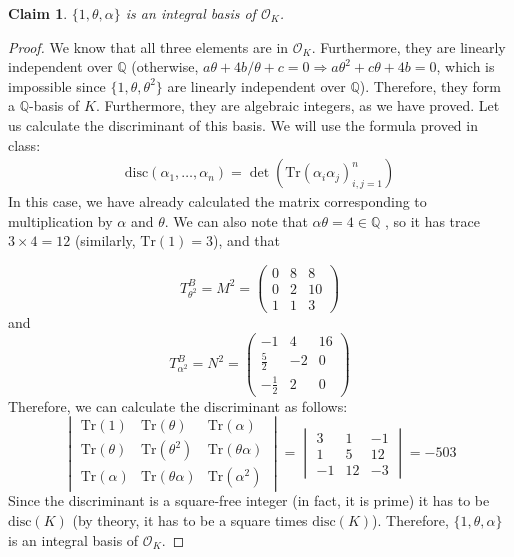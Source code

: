 \documentclass[11pt]{article}
\newtheorem{claim}[theorem]{Claim}
\theoremstyle{definition}
\begin{document}
    \begin{claim}
        $\{1, \theta, \alpha\}$ is an integral basis of $\mathcal{O}_K$.
    \end{claim}
    \begin{proof}
        We know that all three elements are in $\mathcal{O}_K$.
        Furthermore, they are linearly independent over $\mathbb{Q}$
        (otherwise, $a\theta+4b/\theta+c=0 \Rightarrow a\theta^2+c\theta+4b=0$,
        which is impossible since $\{1, \theta, \theta^2\}$ are linearly independent over $\mathbb{Q}$).
        Therefore, they form a $\mathbb{Q}$-basis of $K$.
        Furthermore, they are algebraic integers,
        as we have proved.
        Let us calculate the discriminant of this basis.
        We will use the formula proved in class:
        \begin{align}
            \text{disc}(\alpha_1, \ldots, \alpha_n) = \det(\text{Tr}(\alpha_i\alpha_j)_{i,j=1}^n)
        \end{align}
        In this case, we have already calculated the
        matrix corresponding to multiplication by $\alpha$ and $\theta$.
        We can also note that $\alpha \theta = 4 \in \mathbb{Q}$ ,
        so it has trace $3 \times 4 = 12$ (similarly, $\text{Tr}(1)=3$), and that

        \[T_{\theta^2}^B = M^2 =
            \begin{pmatrix}
                0 & 8 & 8 \\
                0 & 2 & 10 \\
                1 & 1 & 3
            \end{pmatrix}\]
        and
        \[T_{\alpha^2}^B = N^2 =
            \begin{pmatrix}
                -1 & 4 & 16 \\
                \frac{5}{2} & -2 & 0 \\
                -\frac{1}{2} & 2 & 0
            \end{pmatrix}\]
    Therefore, we can calculate the discriminant as follows:
        \[\begin{vmatrix}
            \text{Tr}(1) & \text{Tr}(\theta) & \text{Tr}(\alpha) \\
            \text{Tr}(\theta) & \text{Tr}(\theta^2) & \text{Tr}(\theta\alpha) \\
            \text{Tr}(\alpha) & \text{Tr}(\theta\alpha) & \text{Tr}(\alpha^2)
        \end{vmatrix}=
        \begin{vmatrix}
            3 & 1 & -1 \\
            1 & 5 & 12 \\
            -1 & 12 & -3
        \end{vmatrix} = -503
        \]
        Since the discriminant is a square-free integer (in fact, it is prime)
        it has to be $\text{disc}(K)$ (by theory, it has to be a square times $\text{disc}(K)$).
        Therefore, $\{1, \theta, \alpha\}$ is an integral basis of $\mathcal{O}_K$.

    \end{proof}
\end{document}
